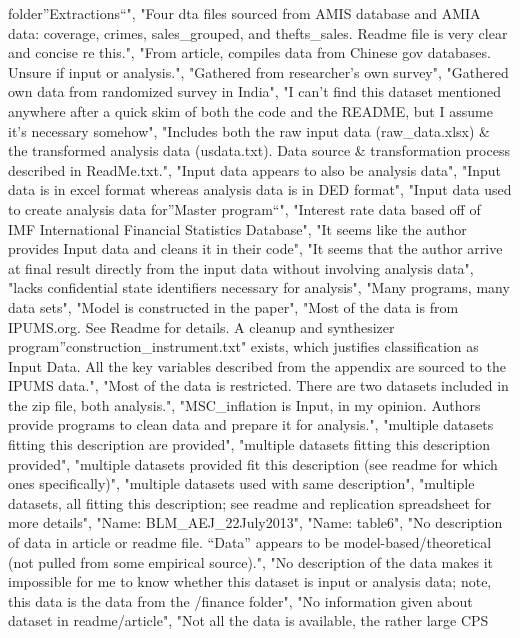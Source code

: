 \documentclass[]{article}
\begin{document}
\begin{itemize}
  folder''Extractions``", "Four dta files sourced from AMIS database and
  AMIA data: coverage, crimes, sales\_grouped, and thefts\_sales. Readme
  file is very clear and concise re this.", "From article, compiles data
  from Chinese gov databases. Unsure if input or analysis.", "Gathered
  from researcher's own survey", "Gathered own data from randomized
  survey in India", "I can't find this dataset mentioned anywhere after
  a quick skim of both the code and the README, but I assume it's
  necessary somehow", "Includes both the raw input data (raw\_data.xlsx)
  \& the transformed analysis data (usdata.txt). Data source \&
  transformation process described in ReadMe.txt.", "Input data appears
  to also be analysis data", "Input data is in excel format whereas
  analysis data is in DED format", "Input data used to create analysis
  data for''Master program``", "Interest rate data based off of IMF
  International Financial Statistics Database", "It seems like the
  author provides Input data and cleans it in their code", "It seems
  that the author arrive at final result directly from the input data
  without involving analysis data", "lacks confidential state
  identifiers necessary for analysis", "Many programs, many data sets",
  "Model is constructed in the paper", "Most of the data is from
  IPUMS.org. See Readme for details. A cleanup and synthesizer
  program''construction\_instrument.txt" exists, which justifies
  classification as Input Data. All the key variables described from the
  appendix are sourced to the IPUMS data.", "Most of the data is
  restricted. There are two datasets included in the zip file, both
  analysis.", "MSC\_inflation is Input, in my opinion. Authors provide
  programs to clean data and prepare it for analysis.", "multiple
  datasets fitting this description are provided", "multiple datasets
  fitting this description provided", "multiple datasets provided fit
  this description (see readme for which ones specifically)", "multiple
  datasets used with same description", "multiple datasets, all fitting
  this description; see readme and replication spreadsheet for more
  details", "Name: BLM\_AEJ\_22July2013", "Name: table6", "No
  description of data in article or readme file. ``Data'' appears to be
  model-based/theoretical (not pulled from some empirical source).", "No
  description of the data makes it impossible for me to know whether
  this dataset is input or analysis data; note, this data is the data
  from the /finance folder", "No information given about dataset in
  readme/article", "Not all the data is available, the rather large CPS

\end{itemize}
\end{document}
